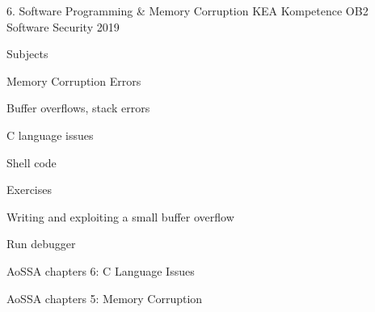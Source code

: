 \documentclass[Screen16to9,17pt]{foils}
\begin{document}
\mytitlepage
{6. Software Programming \& Memory Corruption}
{KEA Kompetence OB2 Software Security 2019}


\begin{list1}
\item Subjects
\begin{list2}
\item Memory Corruption Errors
\item Buffer overflows, stack errors
\item C language issues
\item Shell code
\end{list2}
\item Exercises
\begin{list2}
\item Writing and exploiting a small buffer overflow
\item Run debugger
\end{list2}
\end{list1}


\begin{list1}
\item AoSSA chapters 6: C Language Issues
\item AoSSA chapters 5: Memory Corruption
\end{list1}



\begin{list1}
\item
\end{list1}





\end{document}
